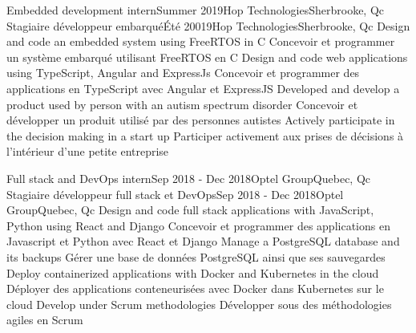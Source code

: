 \documentclass[letterpaper,11pt]{resume}
\begin{document}
    \resumeSubheadingEnFr
      {Embedded development intern}{Summer 2019}{Hop Technologies}{Sherbrooke, Qc}
      {Stagiaire développeur embarqué}{Été 20019}{Hop Technologies}{Sherbrooke, Qc}
        \resumeItemListStart
            \resumeItemEnFr
                {Design and code an embedded system using FreeRTOS in C}
                {Concevoir et programmer un système embarqué utilisant FreeRTOS en C}
            \resumeItemEnFr
                {Design and code web applications using TypeScript, Angular and ExpressJs}
                {Concevoir et programmer des applications en TypeScript avec Angular et ExpressJS}
            \resumeItemEnFr
                {Developed and develop a product used by person with an autism spectrum disorder}
                {Concevoir et développer un produit utilisé par des personnes autistes}
            \resumeItemEnFr
                {Actively participate in the decision making in a start up}
                {Participer activement aux prises de décisions à l'intérieur d'une petite entreprise}
        \resumeItemListEnd

    \resumeSubheadingEnFr
      {Full stack and DevOps intern}{Sep 2018 - Dec 2018}{Optel Group}{Quebec, Qc}
      {Stagiaire développeur full stack et DevOps}{Sep 2018 - Dec 2018}{Optel Group}{Quebec, Qc}
      \resumeItemListStart
        \resumeItemEnFr
            {Design and code full stack applications with JavaScript, Python using React and Django}
            {Concevoir et programmer des applications en Javascript et Python avec React et Django}
        \resumeItemEnFr
            {Manage a PostgreSQL database and its backups}
            {Gérer une base de données PostgreSQL ainsi que ses sauvegardes}
        \resumeItemEnFr
            {Deploy containerized applications with Docker and Kubernetes in the cloud}
            {Déployer des applications conteneurisées avec Docker dans Kubernetes sur le cloud}
        \resumeItemEnFr
            {Develop under Scrum methodologies}
            {Développer sous des méthodologies agiles en Scrum}
      \resumeItemListEnd

    \resumeSubHeadingListEnd
\end{document}
